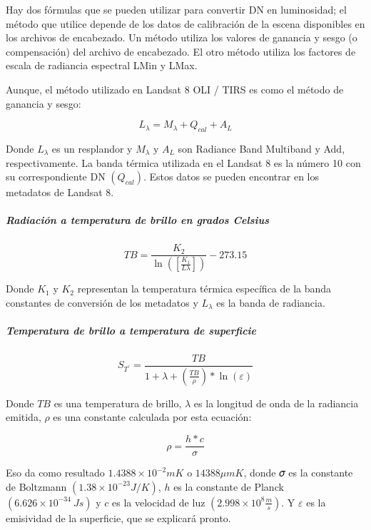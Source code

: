 \documentclass[
]{article}
\begin{document}
Hay dos fórmulas que se pueden utilizar para convertir DN en
luminosidad; el método que utilice depende de los datos de calibración
de la escena disponibles en los archivos de encabezado. Un método
utiliza los valores de ganancia y sesgo (o compensación) del archivo de
encabezado. El otro método utiliza los factores de escala de radiancia
espectral LMin y LMax.

Aunque, el método utilizado en Landsat 8 OLI / TIRS es como el método de
ganancia y sesgo:

\[ L_{\lambda} = M_{\lambda} + Q_{cal} + A_{L}\]

Donde \(L_{\lambda}\) es un resplandor y \(M_{\lambda}\) y \(A_{L}\) son
Radiance Band Multiband y Add, respectivamente. La banda térmica
utilizada en el Landsat 8 es la número 10 con su correspondiente DN
\((𝑄_{cal})\). Estos datos se pueden encontrar en los metadatos de
Landsat 8.

\hypertarget{radiaciuxf3n-a-temperatura-de-brillo-en-grados-celsius}{%
\subparagraph{\texorpdfstring{\emph{Radiación a temperatura de brillo en
grados
Celsius}}{Radiación a temperatura de brillo en grados Celsius}}\label{radiaciuxf3n-a-temperatura-de-brillo-en-grados-celsius}}

\[ TB = \frac{K_{2}}{\ln([\frac{K_{1}}{L\lambda}])} - 273.15\]

Donde \(K_{1}\) y \(K_{2}\) representan la temperatura térmica
específica de la banda constantes de conversión de los metadatos y
\(L_{\lambda}\) es la banda de radiancia.

\hypertarget{temperatura-de-brillo-a-temperatura-de-superficie}{%
\subparagraph{\texorpdfstring{\emph{Temperatura de brillo a temperatura
de
superficie}}{Temperatura de brillo a temperatura de superficie}}\label{temperatura-de-brillo-a-temperatura-de-superficie}}

\[ S_{T^{°}} = \frac{TB}{1+\lambda+(\frac{TB}{\rho}) * \ln(\varepsilon)} \]

Donde \(TB\) es una temperatura de brillo, \(\lambda\) es la longitud de
onda de la radiancia emitida, \(\rho\) es una constante calculada por
esta ecuación:

\[ \rho = \frac{h *c}{\sigma} \]

Eso da como resultado \(1.4388 × 10^{-2} m K\) o \(14388 \mu m K\),
donde 𝜎 es la constante de Boltzmann \((1.38 × 10^{−23} J / K)\), \(h\)
es la constante de Planck \((6.626 × 10^{−34} \ J s)\) y \(c\) es la
velocidad de luz \((2.998 × 10^{8} \frac{m}{s})\). Y \(\varepsilon\) es
la emisividad de la superficie, que se explicará pronto.
\end{document}
